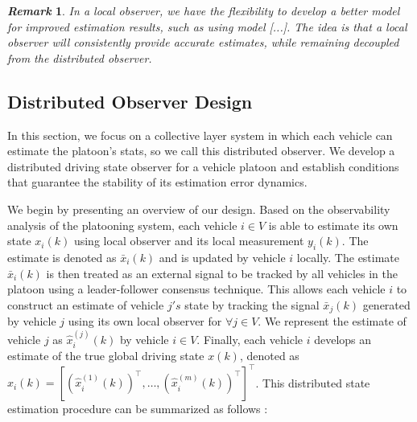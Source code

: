\documentclass[letterpaper, 10pt, conference]{ieeeconf}  %
\newtheorem{remark}{\it Remark}%
\begin{document}
\begin{remark}
In a local observer, we have the flexibility to develop a better model for improved estimation results, such as using model [...]. The idea is that a local observer will consistently provide accurate estimates, while remaining decoupled from the distributed observer.
\end{remark}

\subsection{Distributed Observer Design}
In this section, we focus on a collective layer system in which each vehicle can estimate the platoon's stats, so we call this distributed observer. We develop a distributed driving state observer for a vehicle platoon and establish conditions that guarantee
the stability of its estimation error dynamics.

We begin by presenting an overview of our design. Based
on the observability analysis of the platooning system, each
vehicle $i \in V$ is able to estimate its own state $x_i(k)$ using
local observer and its local measurement $y_i(k)$. The estimate is denoted as $\bar{x}_i(k)$ and is updated by vehicle $i$ 
locally. The estimate $\bar{x}_i(k)$ is then treated as an external signal
to be tracked by all vehicles in the platoon using a leader-follower consensus technique. This allows each vehicle $i$ to
construct an estimate of vehicle $j's$ state by tracking the signal
$\bar{x}_j(k)$ generated by vehicle $j$ using its own local observer for $\forall j \in V$. We represent the estimate of vehicle $j$
as $\hat{x}_i^{(j)}(k)$ by vehicle $i \in V$. Finally, each vehicle $i$ develops
an estimate of the true global driving state $x(k)$, denoted as
$\hat{x}_i(k) = [(\hat{x}_i^{(1)}(k))^\top, \ldots, (\hat{x}_i^{(m)}(k))^\top]^\top$.
This distributed state estimation \cite{Plug_play} procedure can be summarized as follows :
\end{document}
